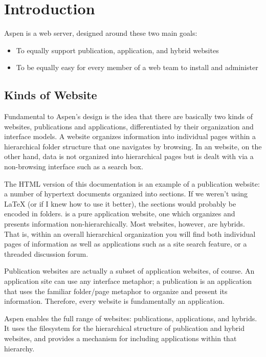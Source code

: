 \chapter{Introduction \label{introduction}}

Aspen is a web server, designed around these two main goals:

\begin{itemize}
\item{To equally support publication, application, and hybrid websites}
\item{To be equally easy for every member of a web team to install and administer}
\end{itemize}


\section{Kinds of Website \label{kinds-of-website}}

Fundamental to Aspen's design is the idea that there are basically two kinds of
websites, publications and applications, differentiated by their organization
and interface models. A  website organizes information into
individual pages within a hierarchical folder structure that one navigates by
browsing. In an  website, on the other hand, data is not
organized into hierarchical pages but is dealt with via a non-browsing interface
such as a search box.

The HTML version of this documentation is an example of a publication website: a
number of hypertext documents organized into sections. If we weren't using LaTeX
(or if I knew how to use it better), the sections would probably be encoded in
folders.  is a pure application
website, one which organizes and presents information non-hierarchically. Most
websites, however, are hybrids. That is, within an overall hierarchical
organization you will find both individual pages of information as well as
applications such as a site search feature, or a threaded discussion forum.

Publication websites are actually a subset of application websites, of course.
An application site can use any interface metaphor; a publication is an
application that uses the familiar folder/page metaphor to organize and present
its information. Therefore, every website is fundamentally an application.

Aspen enables the full range of websites: publications, applications, and
hybrids. It uses the filesystem for the hierarchical structure of publication
and hybrid websites, and provides a mechanism for including applications within
that hierarchy.

